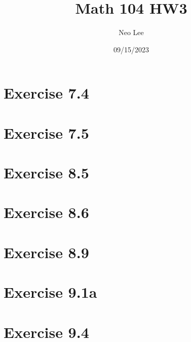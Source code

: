 \documentclass{article}
\title{Math 104 HW3}
\author{Neo Lee}
\date{09/15/2023}
\begin{document}
 

\maketitle 
\section*{Exercise 7.4}
\section*{Exercise 7.5}
\section*{Exercise 8.5}
\section*{Exercise 8.6}
\section*{Exercise 8.9}
\section*{Exercise 9.1a}
\section*{Exercise 9.4}
\end{document}
